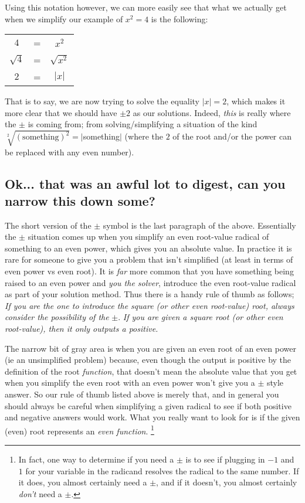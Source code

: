 \documentclass{ximeraXloud}
\begin{document}
Using this notation however, we can more easily see that what we actually get when we simplify our example of $x^2 = 4$ is the following:\\
\begin{center}
    \begin{tabular}{ccc}
        $4$         & = & $x^2$         \\
        $\sqrt{4}$  & = & $\sqrt{x^2}$  \\
        $2$         & = & $|x|$
    \end{tabular}
\end{center}
That is to say, we are now trying to solve the equality $|x| = 2$, which makes it more clear that we should have $\pm 2$ as our solutions. Indeed, \textit{this} is really where the $\pm$ is coming from; from solving/simplifying a situation of the kind $\sqrt[2]{(\text{something})^2}=|$something$|$ (where the $2$ of the root and/or the power can be replaced with any even number).

\subsection*{Ok... that was an awful lot to digest, can you narrow this down some?}

    The short version of the $\pm$ symbol is the last paragraph of the above. Essentially the $\pm$ situation comes up when you simplify an even root-value radical of something to an even power, which gives you an absolute value. In practice it is rare for someone to give you a problem that isn't simplified (at least in terms of even power vs even root). It is \textit{far} more common that you have something being raised to an even power and \textit{you the solver}, introduce the even root-value radical as part of your solution method. Thus there is a handy rule of thumb as follows; \textit{If you are the one to introduce the square (or other even root-value) root, always consider the possibility of the }$\pm$. \textit{If you are given a square root (or other even root-value), then it only outputs a positive.}

    The narrow bit of gray area is when you are given an even root of an even power (ie an unsimplified problem) because, even though the output is positive by the definition of the root \textit{function}, that doesn't mean the absolute value that you get when you simplify the even root with an even power won't give you a $\pm$ style answer. So our rule of thumb listed above is merely that, and in general you should always be careful when simplifying a given radical to see if both positive and negative answers would work. What you really want to look for is if the given (even) root represents an \textit{even function}.%
    \footnote{%
        In fact, one way to determine if you need a $\pm$ is to see if plugging in $-1$ and $1$ for your variable in the radicand resolves the radical to the same number. If it does, you almost certainly need a $\pm$, and if it doesn't, you almost certainly \textit{don't} need a $\pm$.%
        }
        
\end{document}
